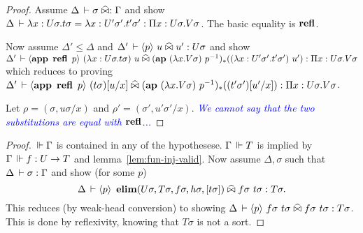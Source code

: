 \documentclass[a4paper,english]{lipics-utf8x}
\newcommand\meta[1]{\noindent\textcolor{blue}{\emph{#1}}}
\begin{document}
  \begin{proof}
    Assume $\Delta \,\vdash \sigma \mathrel{\widehat{\bowtie}} : \Gamma$ and show
    $\Delta \,\vdash \lambda x:U\sigma.t\sigma = \lambda x:U'\sigma'.t'\sigma' :
    \Pi x:U\sigma.V\sigma$.
    The basic equality is $\operatorname{\mathbf{refl}}$.

    Now assume $\Delta' \le \Delta$ and
    $\Delta' \,\vdash \langle p \rangle~ u \mathrel{\widehat{\bowtie}} u' : U\sigma$
    and show $\Delta' \der \hideq{\app \refl\ p}
    (\lambda x:U\sigma.t\sigma)\ u \hEr
    (\ap (\lambda x.V\sigma)\ p\inv)_* ((\lambda x:U'\sigma'.t'\sigma')\ u') :
    \Pi x:U\sigma.V\sigma$ which reduces to proving
    $\Delta' \,\vdash \langle \operatorname{\mathbf{app}~} \operatorname{\mathbf{refl}}\ p \rangle~
    (t\sigma)[u/x] \mathrel{\widehat{\bowtie}} (\operatorname{\mathbf{ap}~} (\lambda x.V\sigma)\ p^{-1})_* ((t'\sigma')[u'/x]) :
    \Pi x:U\sigma.V\sigma$.

    Let $\rho = (\sigma, u\sigma / x)$ and $\rho' = (\sigma', u'\sigma' / x)$.
    \meta{We cannot say that the two substitutions are equal with $\operatorname{\mathbf{refl}}$...}
  \end{proof}

  \begin{lemma}
    \leavevmode
    \begin{mathc}
    \end{mathc}
  \end{lemma}

  \begin{proof}
    $\,\Vdash \Gamma$ is contained in any of the hypothesese.
    $\Gamma \,\Vdash T$ is implied by $\Gamma \,\Vdash f : U \to T$ and
    lemma~\ref{lem:fun-inj-valid}.
    Now assume $\Delta, \sigma$ such that
    $\Delta \,\vdash \sigma : \Gamma$ and
    show (for some $p$)
    \[\Delta \,\vdash \langle p \rangle~
    \operatorname{\mathbf{elim}}(U \sigma,T \sigma,f \sigma,h \sigma,[t \sigma]) \mathrel{\widehat{\bowtie}}
    f \sigma\ t \sigma : T \sigma.\]
    This reduces (by weak-head conversion) to showing
    $\Delta \,\vdash \langle p \rangle~
    f \sigma\ t \sigma \mathrel{\widehat{\bowtie}}
    f \sigma\ t \sigma : T \sigma$.
    This is done by reflexivity, knowing that $T \sigma$ is not a sort.
  \end{proof}

  \begin{lemma}
    \leavevmode
    \begin{mathc}
    \end{mathc}
  \end{lemma}
\end{document}
